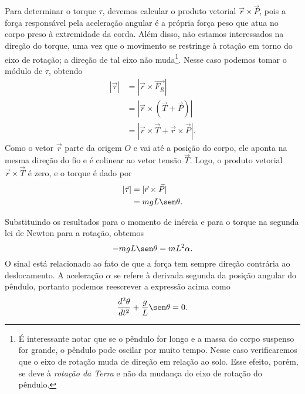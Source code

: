 Para determinar o torque $\tau$, devemos calcular o produto vetorial $\vec{r}\times\vec{P}$, pois a força responsável pela aceleração angular é a própria força peso que atua no corpo preso à extremidade da corda. Além disso, não estamos interessados na direção do torque, uma vez que o movimento se restringe à rotação em torno do eixo de rotação; a direção de tal eixo não muda\footnote{É interessante notar que se o pêndulo for longo e a massa do corpo suspenso for grande, o pêndulo pode oscilar por muito tempo. Nesse caso verificaremos que o eixo de rotação muda de direção em relação ao solo. Esse efeito, porém, se deve à \emph{rotação da Terra} e não da mudança do eixo de rotação do pêndulo.}. Nesse caso podemos tomar o módulo de $\tau$, obtendo
\begin{align}
    |\vec{\tau}| &= |\vec{r}\times\vec{F_R}| \\
    &= |\vec{r}\times(\vec{T} + \vec{P})| \\
    &= |\vec{r}\times\vec{T} + \vec{r}\times\vec{P}|.
\end{align}
%
Como o vetor $\vec{r}$ parte da origem $O$ e vai até a posição do corpo, ele aponta na mesma direção do fio e é colinear ao vetor tensão $\vec{T}$. Logo, o produto vetorial $\vec{r}\times\vec{T}$ é zero, e o torque é dado por
\begin{align}
    |\vec{\tau}| &= |\vec{r}\times\vec{P}| \\
    &= mgL\sen\theta.
\end{align}

Substituindo os resultados para o momento de inércia e para o torque na segunda lei de Newton para a rotação, obtemos
\begin{equation}
    -mgL\sen\theta = mL^2\alpha.
\end{equation}
%
O sinal está relacionado ao fato de que a força tem sempre direção contrária ao deslocamento. A aceleração $\alpha$ se refere à derivada segunda da posição angular do pêndulo, portanto podemos reescrever a expressão acima como
\begin{equation}
    \frac{d^2\theta}{dt^2} + \frac{g}{L} \sen\theta = 0.
\end{equation}

